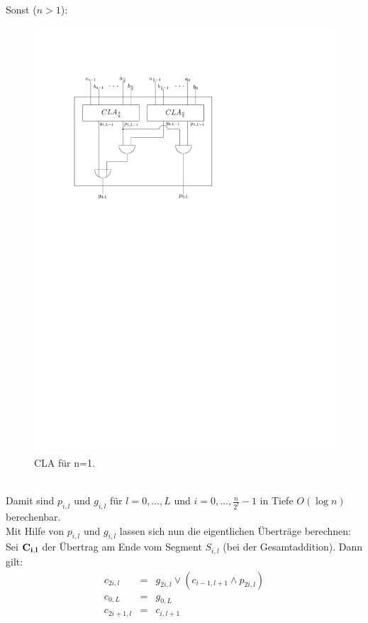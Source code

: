 Sonst ($n>1$): 
\begin{figure}[h!]
\centering
\includegraphics[scale=1.0]{bilder/CLA_n.pdf}
\caption{CLA für n=1.}
\end{figure}
\\Damit sind $p_{i,l}$ und $g_{i,l}$ für $l=0, \dots, L$ und 
$i=0, \dots, \frac{n}{2^l}-1$ in Tiefe $O(\log n)$ berechenbar.
\pagebreak
\\Mit Hilfe von $p_{i,l}$ und $g_{i,l}$ lassen sich nun die eigentlichen Überträge berechnen:
Sei $\bf{C_{i,l}}$ der Übertrag am Ende vom Segment $S_{i,l}$ (bei der Gesamtaddition). 
Dann gilt: 
\begin{eqnarray*}
c_{2i,l} & = & g_{2i,l} \vee (c_{i-1,l+1} \wedge p_{2i,l}) \\
c_{0,L} & = & g_{0,L} \\
c_{2i+1,l} & = & c_{i,l+1}
\end{eqnarray*}
